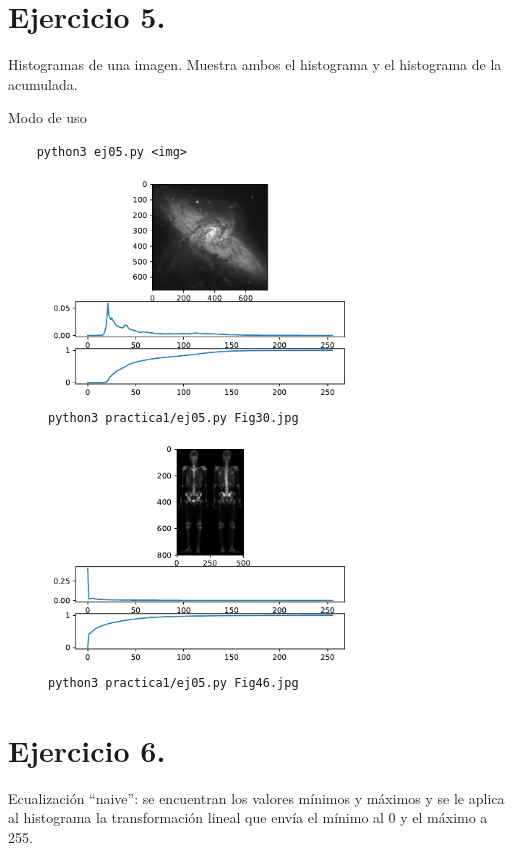\documentclass[11pt, spanish]{article}
\begin{document}
\section{Ejercicio 5.}
Histogramas de una imagen. Muestra ambos el histograma y el histograma de la acumulada.

Modo de uso
\begin{verbatim}
    python3 ej05.py <img>
\end{verbatim}

\begin{figure}[H]
\centering
  \includegraphics[height=6cm]{informe-imgs/ej05-1.pdf}
  \caption{\texttt{python3 practica1/ej05.py Fig30.jpg}}
\end{figure}

\begin{figure}[H]
\centering
  \includegraphics[height=6cm]{informe-imgs/ej05-2.pdf}
  \caption{\texttt{python3 practica1/ej05.py Fig46.jpg}}
\end{figure}


\section{Ejercicio 6.}
Ecualización ``naive'': se encuentran los valores mínimos y máximos y se le aplica al histograma la transformación
lineal que envía el mínimo al 0 y el máximo a 255.
\end{document}
